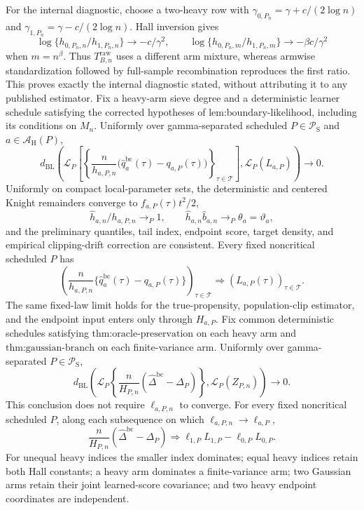For the internal diagnostic, choose a two-heavy row with \(\gamma_{0,P_n}=\gamma+c/(2\log n)\) and \(\gamma_{1,P_n}=\gamma-c/(2\log n)\).  Hall inversion gives
\[
 \log\{h_{0,P_n,n}/h_{1,P_n,n}\}\to-c/\gamma^2,
 \qquad
 \log\{h_{0,P_n,m}/h_{1,P_n,m}\}\to-\beta c/\gamma^2
\]
when \(m=n^\beta\).  Thus \(T^{\mathrm{raw}}_{B,n}\) uses a different arm mixture, whereas armwise standardization followed by full-sample recombination reproduces the first ratio.  This proves exactly the internal diagnostic stated, without attributing it to any published estimator.
Fix a heavy-arm sieve degree and a deterministic learner schedule satisfying the corrected hypotheses of \(\text{lem:boundary-likelihood}\), including its conditions on \(M_n\).  Uniformly over gamma-separated scheduled \(P\in\mathcal P_{\mathrm S}\) and \(a\in\mathcal A_{\mathrm H}(P)\),
\[
 d_{\mathrm{BL}}\!\left(
 \mathcal L_P\!\left[\left\{\frac{n}{h_{a,P,n}}
 \bigl(\widehat q_a^{\mathrm{bc}}(\tau)-q_{a,P}(\tau)\bigr)\right\}_{\tau\in\mathcal T}\right],
 \mathcal L_P(L_{a,P})\right)\longrightarrow0.
\]
Uniformly on compact local-parameter sets, the deterministic and centered Knight remainders converge to \(f_{a,P}(\tau)t^2/2\),
\[
 \widehat h_{a,n}/h_{a,P,n}\to_P1,
 \qquad \widehat h_{a,n}\widehat b_{a,n}\to_P\theta_a=\vartheta_a,
\]
and the preliminary quantiles, tail index, endpoint score, target density, and empirical clipping-drift correction are consistent.  Every fixed noncritical scheduled \(P\) has
\[
 \left(\frac{n}{h_{a,P,n}}
 \{\widehat q_a^{\mathrm{bc}}(\tau)-q_{a,P}(\tau)\}\right)_{\tau\in\mathcal T}
 \Rightarrow (L_{a,P}(\tau))_{\tau\in\mathcal T}.
\]
The same fixed-law limit holds for the true-propensity, population-clip estimator, and the endpoint input enters only through \(H_{a,P}\).
Fix common deterministic schedules satisfying \(\text{thm:oracle-preservation}\) on each heavy arm and \(\text{thm:gaussian-branch}\) on each finite-variance arm.  Uniformly over gamma-separated \(P\in\mathcal P_{\mathrm S}\),
\[
 d_{\mathrm{BL}}\!\left(
 \mathcal L_P\!\left\{\frac n{H_{P,n}}(\widehat\Delta^{\mathrm{bc}}-\Delta_P)\right\},
 \mathcal L_P(Z_{P,n})\right)\longrightarrow0.
\]
This conclusion does not require \(\ell_{a,P,n}\) to converge.  For every fixed noncritical scheduled \(P\), along each subsequence on which \(\ell_{a,P,n}\to\ell_{a,P}\),
\[
 \frac n{H_{P,n}}(\widehat\Delta^{\mathrm{bc}}-\Delta_P)
 \Rightarrow\ell_{1,P}L_{1,P}-\ell_{0,P}L_{0,P}.
\]
For unequal heavy indices the smaller index dominates; equal heavy indices retain both Hall constants; a heavy arm dominates a finite-variance arm; two Gaussian arms retain their joint learned-score covariance; and two heavy endpoint coordinates are independent.
